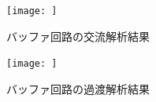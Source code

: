 \documentclass[twocolumn]{jsarticle}
\begin{document}
    \begin{figure}[H]
        \begin{center}
            \texttt{[image: ]}
            \caption{バッファ回路の交流解析結果}
            \label{fig:sim_buf_ac}
        \end{center}
    \end{figure}
    \begin{figure}[H]
        \begin{center}
            \texttt{[image: ]}
            \caption{バッファ回路の過渡解析結果}
            \label{fig:sim_buf_tr}
        \end{center}
    \end{figure}
\end{document}
